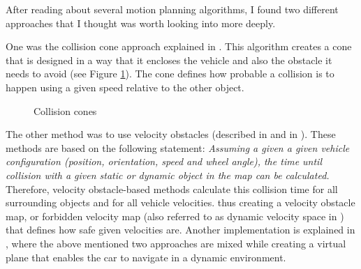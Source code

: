 After reading about several motion planning algorithms, I found two different approaches that I thought was worth looking into more deeply.

One was the collision cone approach explained in \cite{CollisionCone}. This algorithm creates a cone that is designed in a way that it encloses the vehicle and also the obstacle it needs to avoid (see Figure \ref{collision_cones}). The cone defines how probable a collision is to happen using a given speed relative to the other object.

\begin{figure}[!ht]
    \centering
    \caption{Collision cones}
    \label{collision_cones}
\end{figure}

The other method was to use velocity obstacles (described in \cite{VelocityForbiddenMap} and in \cite{VelocityObstacles}). These methods are based on the following statement: \textit{Assuming a given a given vehicle configuration (position, orientation, speed and wheel angle), the time until collision with a given static or dynamic object in the map can be calculated.} Therefore, velocity obstacle-based methods calculate this collision time for all surrounding objects and for all vehicle velocities. thus creating a velocity obstacle map, or forbidden velocity map (also referred to as dynamic velocity space in \cite{DynamicMotionPlanningSurvey}) that defines how safe given velocities are. Another implementation is explained in \cite{ReactivePathPlanning}, where the above mentioned two approaches are mixed while creating a virtual plane that enables the car to navigate in a dynamic environment.

